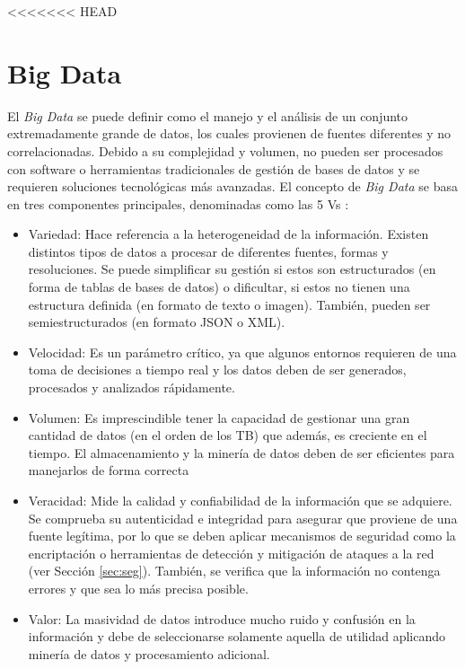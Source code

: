 <<<<<<< HEAD
\section{Big Data}
\label{sec:bigdata}


El \textit{Big Data} \cite{stab} se puede definir como el manejo y el análisis de un conjunto extremadamente grande de datos, los cuales provienen de fuentes diferentes y no correlacionadas. Debido a su complejidad y volumen, no pueden ser procesados con software o herramientas tradicionales de gestión de bases de datos y se requieren soluciones tecnológicas más avanzadas. El concepto de \textit{Big Data} se basa en tres componentes principales, denominadas como las 5 Vs \cite{5vs} \cite{5vs2}:

\begin{itemize}
    \item Variedad: Hace referencia a la heterogeneidad de la información. Existen distintos tipos de datos a procesar de diferentes fuentes, formas y resoluciones. Se puede simplificar su gestión si estos son estructurados (en forma de tablas de bases de datos) o dificultar, si estos no tienen una estructura definida (en formato de texto o imagen). También, pueden ser semiestructurados (en formato JSON o XML).
    \item Velocidad: Es un parámetro crítico, ya que algunos entornos requieren de una toma de decisiones a tiempo real y los datos deben de ser generados, procesados y analizados rápidamente. 
    \item Volumen: Es imprescindible tener la capacidad de gestionar una gran cantidad de datos (en el orden de los TB) que además, es creciente en el tiempo. El almacenamiento y la minería de datos deben de ser eficientes para manejarlos de forma correcta 
    \item Veracidad: Mide la calidad y confiabilidad de la información que se adquiere. Se comprueba su autenticidad e integridad para asegurar que proviene de una fuente legítima, por lo que se deben aplicar mecanismos de seguridad como la encriptación o herramientas de detección y mitigación de ataques a la red (ver Sección \ref{sec:seg}). También, se verifica que la información no contenga errores y que sea lo más precisa posible.
    \item Valor: La masividad de datos introduce mucho ruido y confusión en la información y debe de seleccionarse solamente aquella de utilidad aplicando minería de datos y procesamiento adicional.
\end{itemize}

